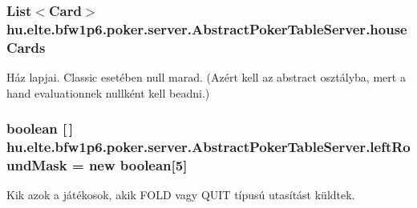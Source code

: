 \subsubsection[{house\+Cards}]{\setlength{\rightskip}{0pt plus 5cm}List$<${\bf Card}$>$ hu.\+elte.\+bfw1p6.\+poker.\+server.\+Abstract\+Poker\+Table\+Server.\+house\+Cards\hspace{0.3cm}{\ttfamily [protected]}}\label{classhu_1_1elte_1_1bfw1p6_1_1poker_1_1server_1_1_abstract_poker_table_server_a97fa87f3df41cc2ed5c4625ffdb41eb0}
Ház lapjai. Classic esetében null marad. (Azért kell az abstract osztályba, mert a hand evaluationnek nullként kell beadni.) \hypertarget{classhu_1_1elte_1_1bfw1p6_1_1poker_1_1server_1_1_abstract_poker_table_server_a3f757729b56bbeba3f4f05eb98e0d202}{}
\subsubsection[{left\+Round\+Mask}]{\setlength{\rightskip}{0pt plus 5cm}boolean \mbox{[}$\,$\mbox{]} hu.\+elte.\+bfw1p6.\+poker.\+server.\+Abstract\+Poker\+Table\+Server.\+left\+Round\+Mask = new boolean\mbox{[}5\mbox{]}\hspace{0.3cm}{\ttfamily [protected]}}\label{classhu_1_1elte_1_1bfw1p6_1_1poker_1_1server_1_1_abstract_poker_table_server_a3f757729b56bbeba3f4f05eb98e0d202}
Kik azok a játékosok, akik F\+O\+L\+D vagy Q\+U\+I\+T típusú utasítást küldtek. \hypertarget{classhu_1_1elte_1_1bfw1p6_1_1poker_1_1server_1_1_abstract_poker_table_server_a6666f184547ebf8f99bf104a79dc7c4d}{}
